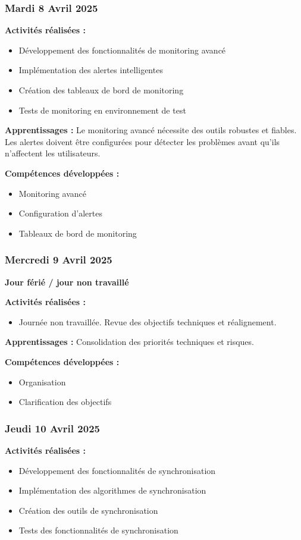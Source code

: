 \documentclass[12pt,a4paper]{article}
\begin{document}
\subsubsection{Mardi 8 Avril 2025}
\textbf{Activités réalisées :}
\begin{itemize}
    \item Développement des fonctionnalités de monitoring avancé
    \item Implémentation des alertes intelligentes
    \item Création des tableaux de bord de monitoring
    \item Tests de monitoring en environnement de test
\end{itemize}

\textbf{Apprentissages :}
Le monitoring avancé nécessite des outils robustes et fiables. Les alertes doivent être configurées pour détecter les problèmes avant qu'ils n'affectent les utilisateurs.

\textbf{Compétences développées :}
\begin{itemize}
    \item Monitoring avancé
    \item Configuration d'alertes
    \item Tableaux de bord de monitoring
\end{itemize}

\subsubsection{Mercredi 9 Avril 2025}
\textbf{Jour férié / jour non travaillé}

\textbf{Activités réalisées :}
\begin{itemize}
    \item Journée non travaillée. Revue des objectifs techniques et réalignement.
\end{itemize}

\textbf{Apprentissages :}
Consolidation des priorités techniques et risques.

\textbf{Compétences développées :}
\begin{itemize}
    \item Organisation
    \item Clarification des objectifs
\end{itemize}

\subsubsection{Jeudi 10 Avril 2025}
\textbf{Activités réalisées :}
\begin{itemize}
    \item Développement des fonctionnalités de synchronisation
    \item Implémentation des algorithmes de synchronisation
    \item Création des outils de synchronisation
    \item Tests des fonctionnalités de synchronisation
\end{itemize}
\end{document}
